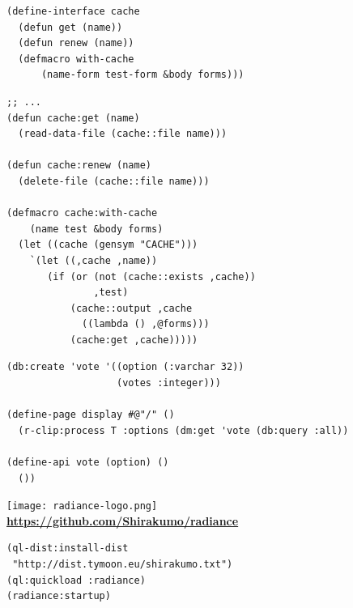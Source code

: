 \documentclass[12pt]{beamer}
\begin{document}
\begin{frame}[fragile]
  \begin{verbatim}
(define-interface cache
  (defun get (name))
  (defun renew (name))
  (defmacro with-cache 
      (name-form test-form &body forms)))
  \end{verbatim}
\end{frame}

\begin{frame}[fragile]
  \begin{verbatim}
;; ...
(defun cache:get (name)
  (read-data-file (cache::file name)))

(defun cache:renew (name)
  (delete-file (cache::file name)))

(defmacro cache:with-cache 
    (name test &body forms)
  (let ((cache (gensym "CACHE")))
    `(let ((,cache ,name))
       (if (or (not (cache::exists ,cache))
               ,test)
           (cache::output ,cache 
             ((lambda () ,@forms)))
           (cache:get ,cache)))))
  \end{verbatim}
\end{frame}

\begin{frame}[fragile]
  \begin{verbatim}
(db:create 'vote '((option (:varchar 32))
                   (votes :integer)))

(define-page display #@"/" ()
  (r-clip:process T :options (dm:get 'vote (db:query :all))

(define-api vote (option) ()
  ())
  \end{verbatim}
\end{frame}

\begin{frame}
\end{frame}

\begin{frame}[fragile]
  \begin{center}
    \hskip1.2cm\texttt{[image: radiance-logo.png]} \\
    {\bfseries \url{https://github.com/Shirakumo/radiance}} \\
    \vspace{0.3cm}
    \begin{verbatim}
(ql-dist:install-dist 
 "http://dist.tymoon.eu/shirakumo.txt")
(ql:quickload :radiance)
(radiance:startup)
    \end{verbatim}
  \end{center}
\end{frame}
\end{document}
